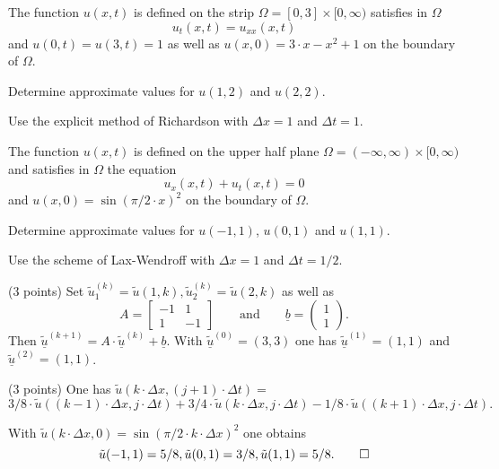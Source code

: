 \begin{teilaufgaben}
\item
The function $u(x,t)$ is defined on the strip
$\Omega = [0, 3] \times [0,\infty)$
satisfies in $\Omega$
\[
u_{t}(x,t) = u_{xx}(x,t)
\]
and $u(0,t) = u(3,t) = 1$ as well as $u(x,0) = 3 \cdot x - x^2 + 1$
on the boundary of $\Omega$.

Determine approximate values for $u(1,2)$ and $u(2,2)$. 

Use the explicit method of Richardson with $\Delta x = 1$ and $\Delta t = 1.$

\item
The function $u(x,t)$ is defined on the upper half plane
$\Omega = (-\infty,\infty) \times [0,\infty)$
and
satisfies in $\Omega$ the equation
\[
u_{x}(x,t) + u_{t}(x,t) = 0
\]
and  $u(x,0) = \sin(\pi/2 \cdot x)^2$ on the boundary of $\Omega$.

Determine approximate values for $u(-1,1)$, $u(0,1)$ and $u(1,1)$. 

Use the scheme of Lax-Wendroff with $\Delta x = 1$ and $\Delta t = 1/2.$
\end{teilaufgaben}

\begin{loesung}
\begin{teilaufgaben}
\item
(3 points) Set
$\tilde u_1^{(k)}
=
\tilde u(1,k), \tilde u_2^{(k)} = \tilde u(2,k)$
as well as
\[
A
=
\left[\begin{array}{rr} -1 & 1  \\ 1 & -1  \end{array}\right]
\qquad\text{and}\qquad
\underline{b}
=
\left(\begin{array}{r} 1  \\ 1   \end{array}\right).
\]
Then $\underline{\tilde u}^{(k+1)}
= A \cdot \underline{\tilde u}^{(k)} + \underline{b}$.
With $\underline{\tilde u}^{(0)} = (3,3)$ one has
$\underline{\tilde u}^{(1)} = (1,1)$ and $\underline{\tilde u}^{(2)} = (1,1)$. 

\item
(3 points) One has $\tilde u(k \cdot \Delta x, (j+1) \cdot \Delta t) =$
\[
3/8 \cdot \tilde u((k-1) \cdot \Delta x, j \cdot \Delta t) + 3/4 \cdot \tilde u(k \cdot \Delta x, j \cdot \Delta t) - 1/8 \cdot \tilde u((k+1) \cdot \Delta x, j \cdot \Delta t).
\]

With $\tilde u(k \cdot \Delta x, 0) = \sin(\pi/2 \cdot k \cdot \Delta x)^2$
one obtains
\[
\tilde u(-1,1) = 5/8, \tilde u(0,1) = 3/8, \tilde u(1,1) = 5/8.
\qedhere
\]
\end{teilaufgaben}
\end{loesung}

